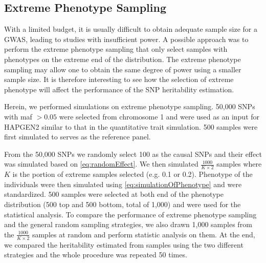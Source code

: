 \documentclass[12pt]{scrbook}
\begin{document}
\subsection{Extreme Phenotype Sampling}
With a limited budget, it is usually difficult to obtain adequate sample size for a \gls{GWAS}, leading to studies with insufficient power.
A possible approach was to perform the extreme phenotype sampling that only select samples with phenotypes on the extreme end of the distribution.
The extreme phenotype sampling may allow one to obtain the same degree of power using a smaller sample size.
It is therefore interesting to see how the selection of extreme phenotype will affect the performance of the \gls{SNP} heritability estimation.

Herein, we performed simulations on extreme phenotype sampling.
50,000 \glspl{SNP} with \gls{maf} $>0.05$ were selected from chromosome 1 and were used as an input for HAPGEN2 similar to that in the quantitative trait simulation.
500 samples were first simulated to serves as the reference panel. 

From the 50,000 \glspl{SNP} we randomly select 100 as the causal \glspl{SNP} and their effect was simulated based on \cref{eq:randomEffect}.
We then simulated $\frac{1000}{K\times2}$ samples where $K$ is the portion of extreme samples selected (e.g. 0.1 or 0.2).
Phenotype of the individuals were then simulated using \cref{eq:simulationOfPhenotype} and were standardized.
500 samples were selected at both end of the phenotype distribution (500 top and 500 bottom, total of 1,000) and were used for the statistical analysis. 
To compare the performance of extreme phenotype sampling and the general random sampling strategies, we also drawn 1,000 samples from the $\frac{1000}{K\times2}$ samples at random and perform statistic analysis on them.
At the end, we compared the heritability estimated from samples using the two different strategies and the whole procedure was repeated 50 times. 
\end{document}
